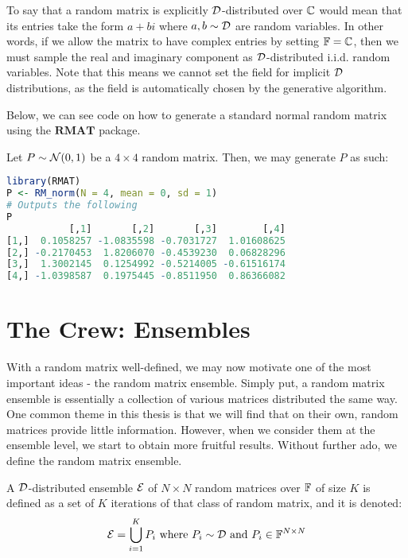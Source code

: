 \begin{remark}
To say that a random matrix is explicitly $\mathcal{D}$-distributed over $\mathbb{C}$ would mean that its entries take the form $a + bi$ where $a,b \sim \mathcal{D}$ are random variables.
In other words, if we allow the matrix to have complex entries by setting $\mathbb{F} = \mathbb{C}$, then we must sample the real and imaginary component as $\mathcal{D}$-distributed i.i.d. random variables.
Note that this means we cannot set the field for implicit $\mathcal{D}$ distributions, as the field is automatically chosen by the generative algorithm.
\end{remark}

\medskip
 Below, we can see code on how to generate a standard normal random matrix using the $\textbf{RMAT}$ package.
\begin{code}
Let $P \sim \mathcal{N}(0,1)$ be a $4 \times 4$ random matrix. Then, we may generate $P$ as such:
\end{code}

\begin{lstlisting}[language=R]
library(RMAT)
P <- RM_norm(N = 4, mean = 0, sd = 1)
# Outputs the following
P
           [,1]       [,2]       [,3]        [,4]
[1,]  0.1058257 -1.0835598 -0.7031727  1.01608625
[2,] -0.2170453  1.8206070 -0.4539230  0.06828296
[3,]  1.3002145  0.1254992 -0.5214005 -0.61516174
[4,] -1.0398587  0.1975445 -0.8511950  0.86366082
\end{lstlisting}


\newpage


\section{The Crew: Ensembles}

With a random matrix well-defined, we may now motivate one of the most important ideas - the random matrix ensemble.
Simply put, a random matrix ensemble is essentially a collection of various matrices distributed the same way.
One common theme in this thesis is that we will find that on their own, random matrices provide little information. However, when we consider them at the ensemble level, we start to obtain more fruitful results.
Without further ado, we define the random matrix ensemble.

\begin{definition}
A $\mathcal{D}$-distributed ensemble $\mathcal{E}$ of $N \times N$ random matrices over $\mathbb{F}$ of size $K$ is defined as a set of $K$ iterations of that class of random matrix, and it is denoted:
$$ \mathcal{E} = \bigcup_{i = 1}^K P_i \text{ where } P_i \sim \mathcal{D} \text{ and } P_i \in \mathbb{F}^{N \times N} $$
\end{definition}

